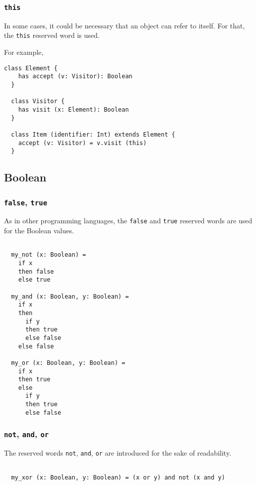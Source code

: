 \documentclass[12pt,a4paper]{article}
\newcommand{\srccode}[1]{\texttt{{#1}}}
\newcommand{\reservedWord}[1]{{\color{blue}\srccode{#1}}\xspace}
\newcommand{\sthis}{\reservedWord{this}}
\newcommand{\sfalse}{\reservedWord{false}}
\newcommand{\strue}{\reservedWord{true}}
\newcommand{\snot}{\reservedWord{not}}
\newcommand{\sand}{\reservedWord{and}}
\newcommand{\sor}{\reservedWord{or}}
\begin{document}
    \subsubsection{\sthis}

    In some cases, it could be necessary that an object can refer to itself.
    For that, the \sthis reserved word is used.

    For example,
    \begin{lstlisting}[label={lst:exampleWith}]
  class Element {
    has accept (v: Visitor): Boolean
  }

  class Visitor {
    has visit (x: Element): Boolean
  }

  class Item (identifier: Int) extends Element {
    accept (v: Visitor) = v.visit (this)
  }
    \end{lstlisting}

    \subsection{Boolean}

    \subsubsection{\sfalse, \strue}

    As in other programming languages, the \sfalse and \strue reserved words are used for the Boolean values.

    \begin{lstlisting}[label={lst:exampleFalseTrue}]

  my_not (x: Boolean) =
    if x
    then false
    else true

  my_and (x: Boolean, y: Boolean) =
    if x
    then
      if y
      then true
      else false
    else false

  my_or (x: Boolean, y: Boolean) =
    if x
    then true
    else
      if y
      then true
      else false
    \end{lstlisting}

    \subsubsection{\snot, \sand, \sor}

    The reserved words \snot, \sand, \sor are introduced for the sake of readability.

    \begin{lstlisting}[label={lst:exampleNotAndOr}]

  my_xor (x: Boolean, y: Boolean) = (x or y) and not (x and y)

    \end{lstlisting}
\end{document}
